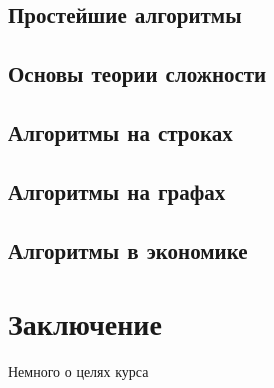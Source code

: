 \documentclass[b5paper,11pt]{book}
\begin{document}
	\section{Простейшие алгоритмы}
	\section{Основы теории сложности}
	\section{Алгоритмы на строках}
	\section{Алгоритмы на графах}
	\section{Алгоритмы в экономике}
	
	
	\chapter*{Заключение}
	Немного о целях курса
	\printbibliography
\end{document}
